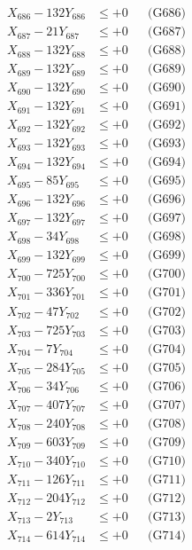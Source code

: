 \documentclass[a4paper,10pt]{article}
\begin{document}
{\begin{align}
X_{686} - 132Y_{686} &\leq +0 && \text{(G686)} \\
X_{687} - 21Y_{687} &\leq +0 && \text{(G687)} \\
X_{688} - 132Y_{688} &\leq +0 && \text{(G688)} \\
X_{689} - 132Y_{689} &\leq +0 && \text{(G689)} \\
X_{690} - 132Y_{690} &\leq +0 && \text{(G690)} \\
\allowbreak
X_{691} - 132Y_{691} &\leq +0 && \text{(G691)} \\
X_{692} - 132Y_{692} &\leq +0 && \text{(G692)} \\
X_{693} - 132Y_{693} &\leq +0 && \text{(G693)} \\
X_{694} - 132Y_{694} &\leq +0 && \text{(G694)} \\
X_{695} - 85Y_{695} &\leq +0 && \text{(G695)} \\
X_{696} - 132Y_{696} &\leq +0 && \text{(G696)} \\
X_{697} - 132Y_{697} &\leq +0 && \text{(G697)} \\
X_{698} - 34Y_{698} &\leq +0 && \text{(G698)} \\
X_{699} - 132Y_{699} &\leq +0 && \text{(G699)} \\
X_{700} - 725Y_{700} &\leq +0 && \text{(G700)} \\
\allowbreak
X_{701} - 336Y_{701} &\leq +0 && \text{(G701)} \\
X_{702} - 47Y_{702} &\leq +0 && \text{(G702)} \\
X_{703} - 725Y_{703} &\leq +0 && \text{(G703)} \\
X_{704} - 7Y_{704} &\leq +0 && \text{(G704)} \\
X_{705} - 284Y_{705} &\leq +0 && \text{(G705)} \\
X_{706} - 34Y_{706} &\leq +0 && \text{(G706)} \\
X_{707} - 407Y_{707} &\leq +0 && \text{(G707)} \\
X_{708} - 240Y_{708} &\leq +0 && \text{(G708)} \\
X_{709} - 603Y_{709} &\leq +0 && \text{(G709)} \\
X_{710} - 340Y_{710} &\leq +0 && \text{(G710)} \\
\allowbreak
X_{711} - 126Y_{711} &\leq +0 && \text{(G711)} \\
X_{712} - 204Y_{712} &\leq +0 && \text{(G712)} \\
X_{713} - 2Y_{713} &\leq +0 && \text{(G713)} \\
X_{714} - 614Y_{714} &\leq +0 && \text{(G714)} \\

\end{align}}
\end{document}
